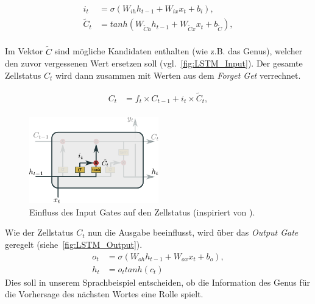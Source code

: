             \begin{equation}
                \begin{split}
                    i_t &= \sigma\left(W_{ih}h_{t-1} + W_{ix}x_t + b_i\right), \\
                    \tilde{C}_t &= tanh\left(W_{\tilde{C}h}h_{t-1} + W_{\tilde{C}x}x_t + b_{\tilde{C}}\right),\\
                \end{split}
            \end{equation}

            Im Vektor $\tilde{C}$ sind mögliche Kandidaten enthalten (wie z.B. das Genus), welcher den zuvor vergessenen Wert ersetzen soll (vgl.~\autoref{fig:LSTM_Input}).
            Der gesamte Zellstatus $C_t$ wird dann zusammen mit Werten aus dem \textit{Forget Get} verrechnet.

            \begin{equation}
                \begin{split}
                    C_t &=f_t\times C_{t-1} + i_t\times \tilde{C}_t, \\
                \end{split}
            \end{equation}

                \begin{figure}[ht]
                    \centering
                    \includegraphics[width=0.5\textwidth]{images/Illustrationen/LSTM_IG}
                    \caption{Einfluss des Input Gates auf den Zellstatus (inspiriert von \cite{OLAH2015}).}
                    \label{fig:LSTM_Input}
                \end{figure}
            
            Wie der Zellstatus $C_t$ nun die Ausgabe beeinflusst, wird über das \textit{Output Gate} geregelt (siehe~\autoref{fig:LSTM_Output}).
            \begin{equation}
                \begin{split}
                    o_t &= \sigma\left(W_{oh}h_{t-1} + W_{ox}x_t + b_o \right), \\
                    h_t &= o_ttanh\left(c_t\right)
                \end{split}
            \end{equation}
            Dies soll in unserem Sprachbeispiel entscheiden, ob die Information des Genus für die Vorhersage des nächsten Wortes eine Rolle spielt. \cite{GERS2000, OLAH2015}

